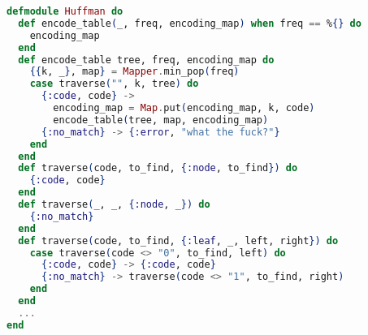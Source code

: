 \begin{lstlisting}[language=Elixir, title=Huffman coding]
defmodule Huffman do
  def encode_table(_, freq, encoding_map) when freq == %{} do
    encoding_map
  end
  def encode_table tree, freq, encoding_map do
    {{k, _}, map} = Mapper.min_pop(freq)
    case traverse("", k, tree) do
      {:code, code} ->
        encoding_map = Map.put(encoding_map, k, code)
        encode_table(tree, map, encoding_map)
      {:no_match} -> {:error, "what the fuck?"}
    end
  end
  def traverse(code, to_find, {:node, to_find}) do
    {:code, code}
  end
  def traverse(_, _, {:node, _}) do
    {:no_match}
  end
  def traverse(code, to_find, {:leaf, _, left, right}) do
    case traverse(code <> "0", to_find, left) do
      {:code, code} -> {:code, code}
      {:no_match} -> traverse(code <> "1", to_find, right)
    end
  end
  ...
end
\end{lstlisting}